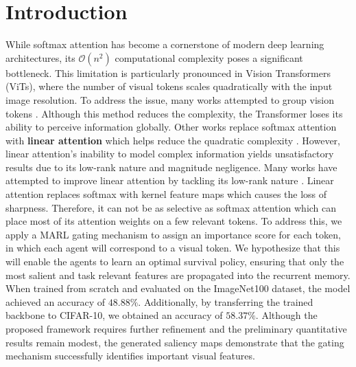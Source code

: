 \section{Introduction}

While softmax attention has become a cornerstone of modern deep learning architectures, its $\mathcal{O}(n^2)$ computational complexity poses a significant bottleneck. This limitation is particularly pronounced in Vision Transformers (ViTs), where the number of visual tokens scales quadratically with the input image resolution.
To address the issue, many works attempted to group vision tokens \cite{dong2022cswin,fan2025semantic,liu2022dynamic}. Although this method reduces the complexity,
the Transformer loses its ability to perceive information globally.
Other works replace softmax attention with \textbf{linear attention} which helps reduce the quadratic complexity \cite{han2023flatten,fan2025breaking,gu2024mamba,cai2023efficientvit}.
However, linear attention's inability to model complex information yields unsatisfactory results due to its low-rank nature and magnitude negligence.
Many works have attempted to improve linear attention by tackling its low-rank nature \cite{fan2025breaking}.
Linear attention replaces softmax with kernel feature maps which causes the loss of sharpness.
Therefore, it can not be as selective as softmax attention which can place most of its attention weights on a few relevant tokens.
To address this, we apply a MARL gating mechanism to assign an importance score for each token, in which each agent will correspond to a visual token. We hypothesize that this will enable the agents to learn an optimal survival policy, ensuring that only the most salient and task relevant features are propagated into the recurrent memory. When trained from scratch and evaluated on the ImageNet100 dataset, the model achieved an accuracy of \(48.88\%\). Additionally, by transferring the trained backbone to CIFAR-10, we obtained an accuracy of \(58.37\%\). Although the proposed framework requires further refinement and the preliminary quantitative results remain modest, the generated saliency maps demonstrate that the gating mechanism successfully identifies important visual features.
